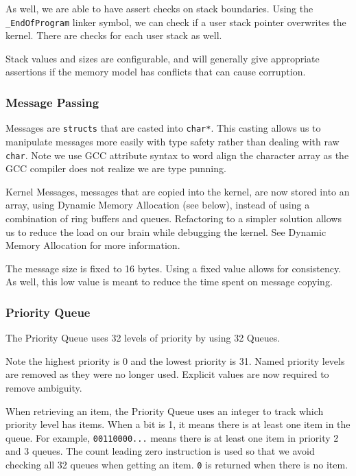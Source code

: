 \documentclass[letterpaper]{article}
\begin{document}
As well, we are able to have assert checks on stack boundaries. Using the \texttt{\_EndOfProgram} linker symbol, we can check if a user stack pointer overwrites the kernel. There are checks for each user stack as well.

Stack values and sizes are configurable, and will generally give appropriate assertions if the memory model has conflicts that can cause corruption.


\subsubsection{Message Passing%
  \label{message-passing}%
}

Messages are \texttt{structs} that are casted into \texttt{char*}. This casting allows us to manipulate messages more easily with type safety rather than dealing with raw \texttt{char}. Note we use GCC attribute syntax to word align the character array as the GCC compiler does not realize we are type punning.

Kernel Messages, messages that are copied into the kernel, are now stored into an array, using Dynamic Memory Allocation (see below), instead of using a combination of ring buffers and queues. Refactoring to a simpler solution allows us to reduce the load on our brain while debugging the kernel. See Dynamic Memory Allocation for more information.

The message size is fixed to 16 bytes. Using a fixed value allows for consistency. As well, this low value is meant to reduce the time spent on message copying.


\subsubsection{Priority Queue%
  \label{priority-queue}%
}

The Priority Queue uses 32 levels of priority by using 32 Queues.

Note the highest priority is 0 and the lowest priority is 31. Named priority levels are removed as they were no longer used. Explicit values are now required to remove ambiguity.

When retrieving an item, the Priority Queue uses an integer to track which priority level has items. When a bit is 1, it means there is at least one item in the queue. For example, \texttt{00110000...} means there is at least one item in priority 2 and 3 queues. The count leading zero instruction is used so that we avoid checking all 32 queues when getting an item. \texttt{0} is returned when there is no item.
\end{document}
